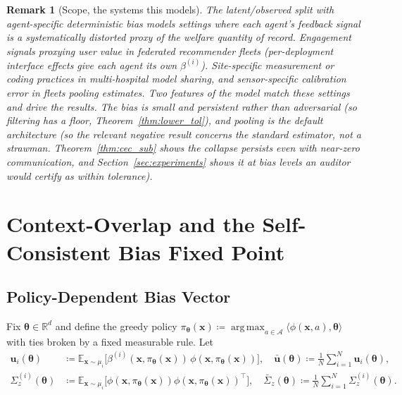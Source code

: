 \documentclass[11pt]{article}
\newtheorem{remark}[theorem]{Remark}
\DeclareMathOperator*{\argmax}{arg\,max}
\begin{document}
\begin{remark}[Scope, the systems this models]\label{rem:motivation}
The latent/observed split with agent-specific deterministic bias
models settings where each agent's \emph{feedback signal} is a
systematically distorted proxy of the welfare quantity of record. Engagement signals proxying user value in federated recommender
fleets (per-deployment interface effects give each agent its own
$\beta^{(i)}$). Site-specific measurement or coding practices in
multi-hospital model sharing, and sensor-specific calibration error in
fleets pooling estimates.  Two features of the model match these
settings and drive the results. The bias is \emph{small and
persistent} rather than adversarial (so filtering has a floor,
Theorem~\ref{thm:lower_tol}), and pooling is the \emph{default}
architecture (so the relevant negative result concerns the standard
estimator, not a strawman. Theorem~\ref{thm:cec_sub} shows the
collapse persists even with near-zero communication, and
Section~\ref{sec:experiments} shows it at bias levels an auditor would
certify as within tolerance).
\end{remark}

\section{Context-Overlap and the Self-Consistent Bias Fixed Point}
\label{sec:overlap}

\subsection{Policy-Dependent Bias Vector}

Fix $\bm{\theta}\in\mathbb{R}^d$ and define the greedy policy
$\pi_{\bm{\theta}}(\bm{x})\coloneqq\argmax_{a\in\mathcal{A}}
\langle\phi(\bm{x},a),\bm{\theta}\rangle$
with ties broken by a fixed measurable rule.  Let
\begin{align}
\bm{u}_i(\bm{\theta})&\coloneqq
\mathbb{E}_{\bm{x}\sim\mu_i}\bigl[\beta^{(i)}(\bm{x},\pi_{\bm{\theta}}(\bm{x}))\,
\phi(\bm{x},\pi_{\bm{\theta}}(\bm{x}))\bigr],\quad
\bar{\bm{u}}(\bm{\theta})\coloneqq\tfrac{1}{N}\sum_{i=1}^N\bm{u}_i(\bm{\theta}),
\label{eq:u_policy}\\
\Sigma_z^{(i)}(\bm{\theta})&\coloneqq
\mathbb{E}_{\bm{x}\sim\mu_i}\bigl[\phi(\bm{x},\pi_{\bm{\theta}}(\bm{x}))
\phi(\bm{x},\pi_{\bm{\theta}}(\bm{x}))^\top\bigr],\quad
\bar{\Sigma}_z(\bm{\theta})\coloneqq\tfrac{1}{N}\sum_{i=1}^N\Sigma_z^{(i)}(\bm{\theta}).
\label{eq:Sigma_policy}
\end{align}
\end{document}
